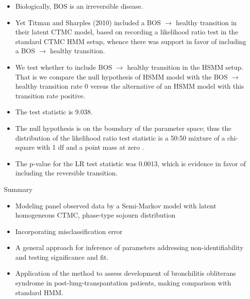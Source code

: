 \documentclass{beamer}
\begin{document}
\begin{frame}
\begin{itemize}
\item Biologically, BOS is an irreversible disease.
\item Yet Titman and Sharples (2010) included a BOS $\rightarrow$ healthy transition in their latent CTMC model, based on recording a likelihood ratio test in the standard CTMC HMM setup, whence there was support in favor of including a BOS $\rightarrow$ healthy transition.
\item We test whether to include BOS $\rightarrow$ healthy transition in the HSMM setup. That is we compare the null hypothesis of HSMM model with the BOS $\rightarrow$ healthy transition rate 0 versus the alternative of an HSMM model with this transition rate positive. 
\item The test statistic is 9.038. 
\item The null hypothesis is on the boundary of the parameter space; thus the distribution of the likelihood ratio test statistic is a 50:50 mixture of a chi-square with 1 df and a point mass at zero \cite{self1987asymptotic}. 
\item The p-value for the LR test statistic was 0.0013, which is evidence in favor of including the reversible transition.
\end{itemize}
\end{frame}
 \begin{frame}{Summary}
\begin{itemize}
\item Modeling panel observed data by a Semi-Markov model with latent homogeneous CTMC, phase-type sojourn distribution
\item Incorporating misclassification error
\item A general approach for inference of parameters addressing non-identifiability and testing significance and fit.
\item Application of the method to assess development of bronchilitis obliterans syndrome in post-lung-transpantation patients, making comparison with standard HMM.
\end{itemize}
\end{frame}
\end{document}
